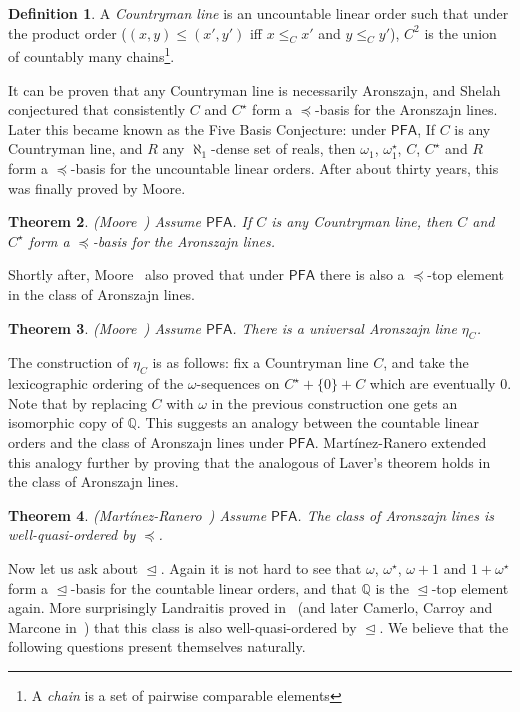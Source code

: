 \documentclass[10pt]{amsart}
\newtheorem{theorem}{Theorem}[section]
\theoremstyle{definition}
\newtheorem{definition}[theorem]{Definition}
\theoremstyle{remark}
\newcommand{\axiom}[1]{\mathsf{#1}}
\newcommand{\PFA}{\axiom{PFA}}
\newcommand{\eleq}{\preceq}
\newcommand{\sleq}{\trianglelefteq}
\newcommand{\1}{\mathbbm{1}}
\begin{document}
\begin{definition}
  A \emph{Countryman line} is an uncountable linear order such that
  under the product order ($(x,y) \le (x',y')$ iff $x \le_{C} x'$ and $y \le_{C} y'$),
  $C^{2}$ is the union of countably many chains\footnote{A \emph{chain} is
    a set of pairwise comparable elements}.
\end{definition}

It can be proven that any Countryman line is necessarily Aronszajn,
and Shelah conjectured that consistently $C$ and $C^{\star}$ form a
$\eleq$-basis for the Aronszajn lines. Later
this became known as the Five Basis Conjecture: under $\PFA$, If $C$
is any Countryman line, and $R$ any $\aleph_{1}$-dense set of reals,
then $\omega_{1}$, $\omega_{1}^{\star}$, $C$, $C^{\star}$ and $R$ form a $\eleq$-basis for the uncountable linear orders. After about thirty years, this was finally
proved by Moore.

\begin{theorem} (Moore~\cite{Moore2006})
  Assume $\PFA$. If $C$ is any Countryman line, then
  $C$ and $C^{\star}$ form a $\eleq$-basis for the Aronszajn lines.
\end{theorem}

Shortly after, Moore~\cite{Moore2009} also proved that under
$\PFA$ there is also a $\eleq$-top element in the class
of Aronszajn lines.

\begin{theorem}\label{thm:univ-line} (Moore~\cite{Moore2009})
  Assume $\PFA$. There is a universal Aronszajn line $\eta_{C}$.
\end{theorem}

The construction of $\eta_{C}$ is as follows: fix a Countryman line $C$,
and take the lexicographic ordering of
the $\omega$-sequences on $C^{\star} + \{0\} + C$ which are eventually
$0$. Note that by replacing $C$ with $\omega$ in the previous construction
one gets an isomorphic copy of $\mathbb{Q}$. This suggests
an analogy between the countable linear orders and the class of Aronszajn lines
under $\PFA$. Martínez-Ranero extended this
analogy further by proving that the analogous of Laver's theorem holds in
the class of Aronszajn lines.

\begin{theorem}\label{thm:wqo-clines} (Martínez-Ranero~\cite{Martinez})
  Assume $\PFA$. The class of Aronszajn lines is well-quasi-ordered by $\eleq$.
\end{theorem}

Now let us ask about $\sleq$. Again it is not hard to see that
$\omega$, $\omega^{\star}$, $\omega + 1$ and $1 + \omega^{\star}$ form
a $\sleq$-basis for the countable linear orders, and that $\mathbb{Q}$ is
the $\sleq$-top element again. More surprisingly
Landraitis proved in~\cite{Landraitis}
(and later Camerlo, Carroy and Marcone in~\cite{CamerloEtAl2015}) that this class is also well-quasi-ordered by $\sleq$. We believe that
the following questions present themselves naturally.
\end{document}
